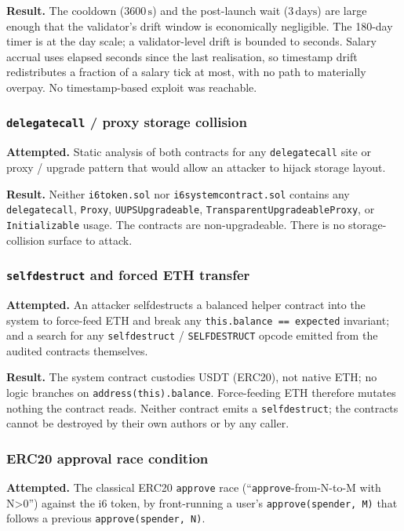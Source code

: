 \documentclass[11pt,a4paper]{article}
\begin{document}
\textbf{Result.} The cooldown (\(3600\,\text{s}\)) and the post-launch wait
(\(3\,\text{days}\)) are large enough that the validator's drift window is
economically negligible. The 180-day timer is at the day scale; a
validator-level drift is bounded to seconds. Salary accrual uses elapsed
seconds since the last realisation, so timestamp drift redistributes a
fraction of a salary tick at most, with no path to materially overpay.
No timestamp-based exploit was reachable.

\subsubsection*{\texttt{delegatecall} / proxy storage collision}

\textbf{Attempted.} Static analysis of both contracts for any
\texttt{delegatecall} site or proxy / upgrade pattern that would allow an
attacker to hijack storage layout.

\textbf{Result.} Neither \texttt{i6token.sol} nor \texttt{i6systemcontract.sol}
contains any \texttt{delegatecall}, \texttt{Proxy}, \texttt{UUPSUpgradeable},
\texttt{TransparentUpgradeableProxy}, or \texttt{Initializable} usage. The
contracts are non-upgradeable. There is no storage-collision surface to
attack.

\subsubsection*{\texttt{selfdestruct} and forced ETH transfer}

\textbf{Attempted.} An attacker selfdestructs a balanced helper contract
into the system to force-feed ETH and break any
\texttt{this.balance == expected} invariant; and a search for any
\texttt{selfdestruct} / \texttt{SELFDESTRUCT} opcode emitted from the
audited contracts themselves.

\textbf{Result.} The system contract custodies USDT (ERC20), not native ETH;
no logic branches on \texttt{address(this).balance}. Force-feeding ETH
therefore mutates nothing the contract reads. Neither contract emits a
\texttt{selfdestruct}; the contracts cannot be destroyed by their own
authors or by any caller.

\subsubsection*{ERC20 approval race condition}

\textbf{Attempted.} The classical ERC20 \texttt{approve} race
(``\texttt{approve}-from-N-to-M with N>0'') against the i6 token, by
front-running a user's \texttt{approve(spender, M)} that follows a previous
\texttt{approve(spender, N)}.
\end{document}
